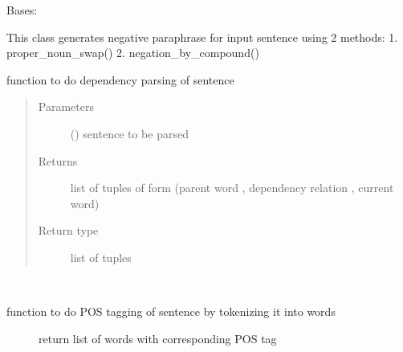 \documentclass[letterpaper,10pt,english]{sphinxmanual}
\begin{document}
\begin{fulllineitems}
\label{\detokenize{ParaphraseDatasetCreation.Hindi:ParaphraseDatasetCreation.Hindi.Negative.Negative_Paraphrases}}
Bases: 

This class generates negative paraphrase for input sentence using 2 methods:
1. proper\_noun\_swap()
2. negation\_by\_compound()

\begin{fulllineitems}
\label{\detokenize{ParaphraseDatasetCreation.Hindi:ParaphraseDatasetCreation.Hindi.Negative.Negative_Paraphrases.get_dep_tree}}
function to do dependency parsing of sentence
\begin{quote}\begin{description}
\item[{Parameters}] \leavevmode
{} () \textendash{} sentence to be parsed

\item[{Returns}] \leavevmode
list of tuples of form (parent word , dependency relation , current word)

\item[{Return type}] \leavevmode
list of tuples

\end{description}\end{quote}

\end{fulllineitems}


\begin{fulllineitems}
\label{\detokenize{ParaphraseDatasetCreation.Hindi:ParaphraseDatasetCreation.Hindi.Negative.Negative_Paraphrases.get_tagged_sent}}~\begin{description}
\item[{function to do POS tagging of sentence by tokenizing it into words}] \leavevmode
return list of words with corresponding POS tag


\end{description}
\end{fulllineitems}
\end{fulllineitems}
\end{document}
